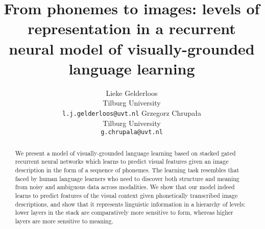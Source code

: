 \documentclass[11pt]{article}
\title{From phonemes to images: levels of representation in a recurrent neural
model of visually-grounded language learning}
\author{Lieke Gelderloos \\
    Tilburg University \\
    {\tt l.j.gelderloos@uvt.nl} \And
    Grzegorz Chrupała \\
    Tilburg University \\
    {\tt g.chrupala@uvt.nl} }
\date{}
\begin{document}
\setlength{\abovedisplayskip}{0.5em}
\setlength{\belowdisplayskip}{0.5em}
\setlength{\belowcaptionskip}{-10pt}
\maketitle
\begin{abstract}
We present a model of visually-grounded language learning based on stacked gated recurrent neural networks which learns to predict visual features given an image description in the form of a sequence of phonemes. The learning task resembles that faced by human language learners who need to discover both structure and meaning from noisy and ambiguous data across modalities. We show that our model indeed learns to predict features of the visual context given phonetically transcribed image descriptions, and show that it represents linguistic information in a hierarchy of levels: lower layers in the stack are comparatively more sensitive to form, whereas higher layers are more sensitive to meaning.
\end{abstract}












\end{document}
